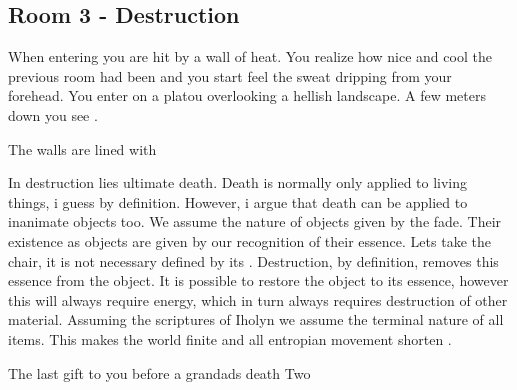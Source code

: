 \subsection*{Room 3 - Destruction}
When entering you are hit by a wall of heat. You realize how nice and cool the previous room had been and you start feel the sweat dripping from your forehead. You enter on a platou overlooking a hellish landscape. A few meters down you see .

The walls are lined with 

In destruction lies ultimate death. Death is normally only applied to living things, i guess by definition. However, i argue that death can be applied to inanimate objects too. We assume the nature of objects given by the fade. Their existence as objects are given by our recognition of their essence. Lets take the chair, it is not necessary defined by its . Destruction, by definition, removes this essence from the object. It is possible to restore the object to its essence, however this will always require energy, which in turn always requires destruction of other material. Assuming the scriptures of Iholyn we assume the terminal nature of all items. This makes the world finite and all entropian movement shorten .

The last gift to you before a grandads death
Two 